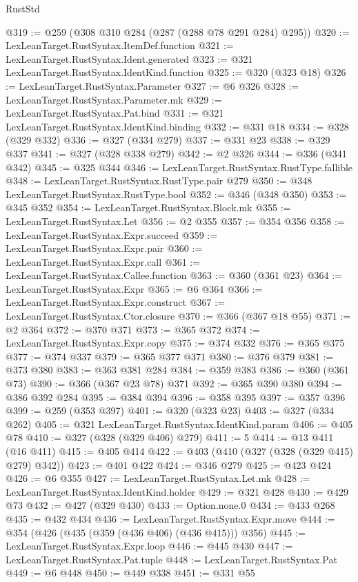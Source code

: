 \begin{lexlean}{RustStd}
\begin{coremodule}
{\begin{coremodule}
{{{{{{{{{@319 := @259 (@308 @310 @284 (@287 (@288 @78 @291 @284) @295))
@320 := LexLeanTarget.RustSyntax.ItemDef.function
@321 := LexLeanTarget.RustSyntax.Ident.generated
@323 := @321 LexLeanTarget.RustSyntax.IdentKind.function
@325 := @320 (@323 @18)
@326 := LexLeanTarget.RustSyntax.Parameter
@327 := @6 @326
@328 := LexLeanTarget.RustSyntax.Parameter.mk
@329 := LexLeanTarget.RustSyntax.Pat.bind
@331 := @321 LexLeanTarget.RustSyntax.IdentKind.binding
@332 := @331 @18
@334 := @328 (@329 @332)
@336 := @327 (@334 @279)
@337 := @331 @23
@338 := @329 @337
@341 := @327 (@328 @338 @279)
@342 := @2 @326
@344 := @336 (@341 @342)
@345 := @325 @344
@346 := LexLeanTarget.RustSyntax.RustType.fallible
@348 := LexLeanTarget.RustSyntax.RustType.pair @279
@350 := @348 LexLeanTarget.RustSyntax.RustType.bool
@352 := @346 (@348 @350)
@353 := @345 @352
@354 := LexLeanTarget.RustSyntax.Block.mk
@355 := LexLeanTarget.RustSyntax.Let
@356 := @2 @355
@357 := @354 @356
@358 := LexLeanTarget.RustSyntax.Expr.succeed
@359 := LexLeanTarget.RustSyntax.Expr.pair
@360 := LexLeanTarget.RustSyntax.Expr.call
@361 := LexLeanTarget.RustSyntax.Callee.function
@363 := @360 (@361 @23)
@364 := LexLeanTarget.RustSyntax.Expr
@365 := @6 @364
@366 := LexLeanTarget.RustSyntax.Expr.construct
@367 := LexLeanTarget.RustSyntax.Ctor.closure
@370 := @366 (@367 @18 @55)
@371 := @2 @364
@372 := @370 @371
@373 := @365 @372
@374 := LexLeanTarget.RustSyntax.Expr.copy
@375 := @374 @332
@376 := @365 @375
@377 := @374 @337
@379 := @365 @377 @371
@380 := @376 @379
@381 := @373 @380
@383 := @363 @381 @284
@384 := @359 @383
@386 := @360 (@361 @73)
@390 := @366 (@367 @23 @78) @371
@392 := @365 @390 @380
@394 := @386 @392 @284
@395 := @384 @394
@396 := @358 @395
@397 := @357 @396
@399 := @259 (@353 @397)
@401 := @320 (@323 @23)
@403 := @327 (@334 @262)
@405 := @321 LexLeanTarget.RustSyntax.IdentKind.param
@406 := @405 @78
@410 := @327 (@328 (@329 @406) @279)
@411 := 5
@414 := @13 @411 (@16 @411)
@415 := @405 @414
@422 := @403 (@410 (@327 (@328 (@329 @415) @279) @342))
@423 := @401 @422
@424 := @346 @279
@425 := @423 @424
@426 := @6 @355
@427 := LexLeanTarget.RustSyntax.Let.mk
@428 := LexLeanTarget.RustSyntax.IdentKind.holder
@429 := @321 @428
@430 := @429 @73
@432 := @427 (@329 @430)
@433 := Option.none.{0}
@434 := @433 @268
@435 := @432 @434
@436 := LexLeanTarget.RustSyntax.Expr.move
@444 := @354 (@426 (@435 (@359 (@436 @406) (@436 @415))) @356)
@445 := LexLeanTarget.RustSyntax.Expr.loop
@446 := @445 @430
@447 := LexLeanTarget.RustSyntax.Pat.tuple
@448 := LexLeanTarget.RustSyntax.Pat
@449 := @6 @448
@450 := @449 @338
@451 := @331 @55
}}}}}}}}}
\end{coremodule}}
\end{coremodule}
\end{lexlean}
